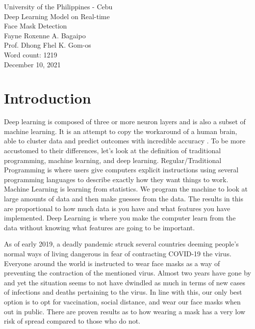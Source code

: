 \documentclass[a4paper,12pt]{article}
\begin{document}
\begin{titlepage}
   \begin{center}
        University of the Philippines - Cebu\\
        \vspace{8cm}
       Deep Learning Model on Real-time\\ Face Mask Detection
       \vspace{8cm}\\
       Fayne Roxenne A. Bagaipo\\
       Prof. Dhong Fhel K. Gom-os\\
       Word count: 1219\\
       December 10, 2021
            
   \end{center}
\end{titlepage}

\section{Introduction}
Deep learning is composed of three or more neuron layers and is also a subset of machine learning. It is an attempt to copy the workaround of a human brain, able to cluster data and predict outcomes with incredible accuracy \citep{IBMCloudEduc}. To be more accustomed to their differences, let’s look at the definition of traditional programming, machine learning, and deep learning. Regular/Traditional Programming is where users give computers explicit instructions using several programming languages to describe exactly how they want things to work. Machine Learning is learning from statistics. We program the machine to look at large amounts of data and then make guesses from the data. The results in this are proportional to how much data is you have and what features you have implemented. Deep Learning is where you make the computer learn from the data without knowing what features are going to be important.

As of early 2019, a deadly pandemic struck several countries deeming people’s normal ways of living dangerous in fear of contracting COVID-19 the virus. Everyone around the world is instructed to wear face masks as a way of preventing the contraction of the mentioned virus. Almost two years have gone by and yet the situation seems to not have dwindled as much in terms of new cases of infections and deaths pertaining to the virus. In line with this, our only best option is to opt for vaccination, social distance, and wear our face masks when out in public. There are proven results as to how wearing a mask has a very low risk of spread compared to those who do not.
\end{document}

